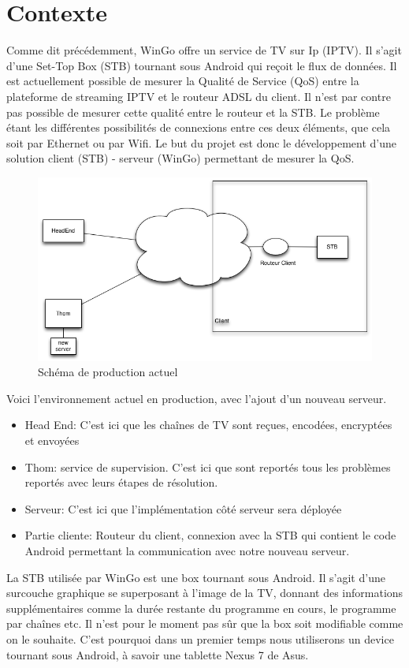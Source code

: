 
\chapter{Contexte}

Comme dit précédemment, WinGo offre un service de TV sur Ip (IPTV). Il s'agit d'une Set-Top Box (STB) tournant sous Android qui reçoit le flux de données. Il est actuellement possible de mesurer la Qualité de Service (QoS) entre la plateforme de streaming IPTV et le routeur ADSL du client. Il n'est par contre pas possible de mesurer cette qualité entre le routeur et la STB. Le problème étant les différentes possibilités de connexions entre ces deux éléments, que cela soit par Ethernet ou par Wifi. Le but du projet est donc le développement d'une solution client (STB) - serveur (WinGo) permettant de mesurer la QoS.

\begin{figure}[H]
    \begin{center}
        \centering \includegraphics[width=0.7\linewidth]{CDC/schema_comm.png}
        \caption{Schéma de production actuel}
    \end{center}
\end{figure}

Voici l'environnement actuel en production, avec l'ajout d'un nouveau serveur.
\begin{itemize}
	\item Head End: C'est ici que les chaînes de TV sont reçues, encodées, encryptées et envoyées
	\item Thom: service de supervision. C'est ici que sont reportés tous les problèmes reportés avec leurs étapes de résolution.
	\item Serveur: C'est ici que l'implémentation côté serveur sera déployée
	\item Partie cliente: Routeur du client, connexion avec la STB qui contient le code Android permettant la communication avec notre nouveau serveur.
\end{itemize}

\medskip

La STB utilisée par WinGo est une box tournant sous Android. Il s'agit d'une surcouche graphique se superposant à l'image de la TV, donnant des informations supplémentaires comme la durée restante du programme en cours, le programme par chaînes etc. Il n'est pour le moment pas sûr que la box soit modifiable comme on le souhaite. C'est pourquoi dans un premier temps nous utiliserons un device tournant sous Android, à savoir une tablette Nexus 7 de Asus.

